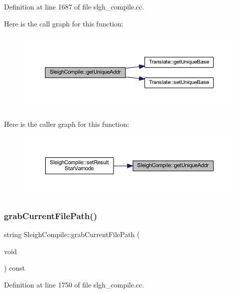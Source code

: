 Definition at line 1687 of file slgh\+\_\+compile.\+cc.

Here is the call graph for this function\+:
\nopagebreak
\begin{figure}[H]
\begin{center}
\leavevmode
\includegraphics[width=350pt]{class_sleigh_compile_a32f70f8b08cba76013faffe61966a080_cgraph}
\end{center}
\end{figure}
Here is the caller graph for this function\+:
\nopagebreak
\begin{figure}[H]
\begin{center}
\leavevmode
\includegraphics[width=350pt]{class_sleigh_compile_a32f70f8b08cba76013faffe61966a080_icgraph}
\end{center}
\end{figure}
\mbox{\label{class_sleigh_compile_afe364bd89e5cc56e0e6579138d214772}} 
\subsubsection{\texorpdfstring{grabCurrentFilePath()}{grabCurrentFilePath()}}
{\footnotesize\ttfamily string Sleigh\+Compile\+::grab\+Current\+File\+Path (\begin{DoxyParamCaption}\item[{void}]{ }\end{DoxyParamCaption}) const}



Definition at line 1750 of file slgh\+\_\+compile.\+cc.

